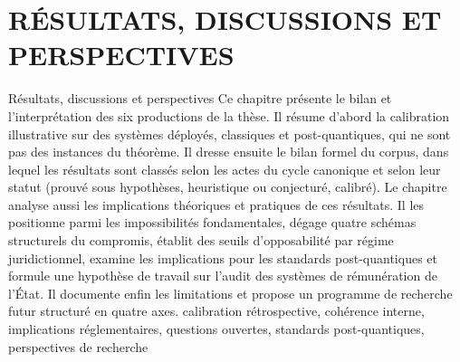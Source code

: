 \documentclass[a4paper,11pt,reqno,oneside]{memoir}
\begin{document}
\chapter{R\'ESULTATS, DISCUSSIONS ET PERSPECTIVES}%
\label{chap:resultats_discussions}
\debutChapitre%
  {R\'esultats, discussions et perspectives}%
  {%
    Ce chapitre pr\'esente le bilan et l'interpr\'etation des
    six productions de la th\`ese. Il r\'esume d'abord la calibration illustrative sur des
    syst\`emes d\'eploy\'es, classiques et post-quantiques, qui ne sont pas des
    instances du th\'eor\`eme. Il dresse ensuite le bilan formel du corpus,
    dans lequel les r\'esultats sont class\'es selon les actes du cycle canonique et selon
    leur statut (prouv\'e sous hypoth\`eses, heuristique ou conjectur\'e,
    calibr\'e). Le chapitre analyse aussi les implications th\'eoriques et
    pratiques de ces r\'esultats. Il les positionne parmi les impossibilit\'es
    fondamentales, d\'egage quatre sch\'emas structurels du compromis, \'etablit
    des seuils d'opposabilit\'e par r\'egime juridictionnel, examine les
    implications pour les standards post-quantiques et formule une hypoth\`ese de travail sur l'audit des syst\`emes de r\'emun\'eration
    de l'\'Etat. Il documente enfin
    les limitations et propose un programme de recherche futur
    structur\'e en quatre axes.%
  }%
  {%
    calibration r\'etrospective, coh\'erence interne, implications
    r\'eglementaires, questions ouvertes, standards post-quantiques,
    perspectives de recherche%
  }%










\clearpage
{}
\printbibliography[
  title={R\'EF\'ERENCES BIBLIOGRAPHIQUES},
  heading=bibintoc
]
\appendix
\renewcommand{\thetable}{\thechapter.\arabic{table}}%
\renewcommand{\thefigure}{\thechapter.\arabic{figure}}%
\renewcommand{\theequation}{\thechapter.\arabic{equation}}%
\debutAnnexes




\end{document}
